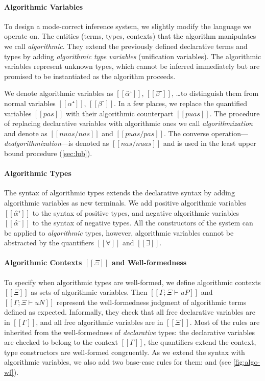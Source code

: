 \paragraph*{Algorithmic Variables}
To design a mode-correct inference system, we slightly modify the language we operate on.
The entities (terms, types, contexts) that the algorithm manipulates we call \emph{algorithmic}. 
They extend the previously defined declarative terms and types by adding 
\emph{algorithmic type variables} (\aka unification variables). 
The algorithmic variables represent unknown types, 
which cannot be inferred immediately but are promised to be instantiated
as the algorithm proceeds.

We denote algorithmic variables as $[[α̂⁺]]$, $[[β̂⁻]]$, \dots to distinguish
them from normal variables $[[α⁺]]$, $[[β⁻]]$. In a few places, we replace the
quantified variables $[[pas]]$ with their algorithmic counterpart $[[puas]]$.
The procedure of replacing declarative variables with algorithmic ones we call
\emph{algorithmization} and denote as $[[ nuas/nas ]]$ and $[[ puas/pas ]]$. The
converse operation---\emph{dealgorithmization}---is denoted as $[[ nas/nuas ]]$ and 
is used in the least upper bound procedure (\cref{sec:lub}).

\paragraph*{Algorithmic Types}
The syntax of algorithmic types extends the declarative syntax by adding
algorithmic variables as new terminals. We add positive algorithmic variables $[[α̂⁺]]$ 
to the syntax of positive types, and negative algorithmic variables $[[α̂⁻]]$ to the 
syntax of negative types. All the constructors of the system can be applied 
to \emph{algorithmic} types, however, algorithmic variables cannot be abstracted by the
quantifiers $[[∀]]$ and $[[∃]]$.

\paragraph*{Algorithmic Contexts $[[Ξ]]$ and Well-formedness}
To specify when algorithmic types are well-formed, we define algorithmic
contexts $[[Ξ]]$ as sets of algorithmic variables. Then
$[[Γ ; Ξ ⊢ uP]]$ and $[[Γ ; Ξ ⊢ uN]]$ represent the well-formedness judgment of
algorithmic terms defined as expected. Informally, they check that all free
declarative variables are in $[[Γ]]$, and all free algorithmic variables are in
$[[Ξ]]$. Most of the rules are inherited from the well-formedness of
\emph{declarative} types: the declarative variables are checked to belong to the
context $[[Γ]]$, the quantifiers extend the context, type constructors are
well-formed congruently. As we extend the syntax with algorithmic variables, we
also add two base-case rules for them:  and
 (see \cref{fig:algo-wf}).


